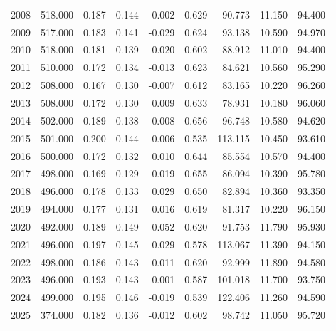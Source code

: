 \begin{table}[t]
\begin{tabular*}{\linewidth}{@{\extracolsep{\fill}}rrrrrrrrr}
2008 & 518.000 & 0.187 & 0.144 & -0.002 & 0.629 & 90.773 & 11.150 & 94.400 \\ 
2009 & 517.000 & 0.183 & 0.141 & -0.029 & 0.624 & 93.138 & 10.590 & 94.970 \\ 
2010 & 518.000 & 0.181 & 0.139 & -0.020 & 0.602 & 88.912 & 11.010 & 94.400 \\ 
2011 & 510.000 & 0.172 & 0.134 & -0.013 & 0.623 & 84.621 & 10.560 & 95.290 \\ 
2012 & 508.000 & 0.167 & 0.130 & -0.007 & 0.612 & 83.165 & 10.220 & 96.260 \\ 
2013 & 508.000 & 0.172 & 0.130 & 0.009 & 0.633 & 78.931 & 10.180 & 96.060 \\ 
2014 & 502.000 & 0.189 & 0.138 & 0.008 & 0.656 & 96.748 & 10.580 & 94.620 \\ 
2015 & 501.000 & 0.200 & 0.144 & 0.006 & 0.535 & 113.115 & 10.450 & 93.610 \\ 
2016 & 500.000 & 0.172 & 0.132 & 0.010 & 0.644 & 85.554 & 10.570 & 94.400 \\ 
2017 & 498.000 & 0.169 & 0.129 & 0.019 & 0.655 & 86.094 & 10.390 & 95.780 \\ 
2018 & 496.000 & 0.178 & 0.133 & 0.029 & 0.650 & 82.894 & 10.360 & 93.350 \\ 
2019 & 494.000 & 0.177 & 0.131 & 0.016 & 0.619 & 81.317 & 10.220 & 96.150 \\ 
2020 & 492.000 & 0.189 & 0.149 & -0.052 & 0.620 & 91.753 & 11.790 & 95.930 \\ 
2021 & 496.000 & 0.197 & 0.145 & -0.029 & 0.578 & 113.067 & 11.390 & 94.150 \\ 
2022 & 498.000 & 0.186 & 0.143 & 0.011 & 0.620 & 92.999 & 11.890 & 94.580 \\ 
2023 & 496.000 & 0.193 & 0.143 & 0.001 & 0.587 & 101.018 & 11.700 & 93.750 \\ 
2024 & 499.000 & 0.195 & 0.146 & -0.019 & 0.539 & 122.406 & 11.260 & 94.590 \\ 
2025 & 374.000 & 0.182 & 0.136 & -0.012 & 0.602 & 98.742 & 11.050 & 95.720 \\ 
\bottomrule
\end{tabular*}
\end{table}

